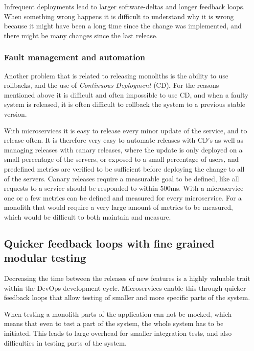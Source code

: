 \documentclass{article}
\begin{document}
Infrequent deployments lead to larger software-deltas and longer feedback loops. When something wrong happens it is difficult to understand why it is wrong because it might have been a long time since the change was implemented, and there might be many changes since the last release.

\subsubsection{Fault management and automation}
Another problem that is related to releasing monoliths is the ability to use rollbacks, and the use of \textit{Continuous Deployment} (CD). For the reasons mentioned above it is difficult and often impossible to use CD, and when a faulty system is released, it is often difficult to rollback the system to a previous stable version.

With microservices it is easy to release every minor update of the service, and to release often. It is therefore very easy to automate releases with CD's as well as managing releases with canary releases, where the update is only deployed on a small percentage of the servers, or exposed to a small percentage of users, and predefined metrics are verified to be sufficient before deploying the change to all of the servers. Canary releases require a measurable goal to be defined, like all requests to a service should be responded to within 500ms. With a microservice one or a few metrics can be defined and measured for every microservice. For a monolith that would require a very large amount of metrics to be measured, which would be difficult to both maintain and measure.


\subsection{Quicker feedback loops with fine grained modular testing}
Decreasing the time between the releases of new features is a highly valuable trait within the DevOps development cycle. Microservices enable this through quicker feedback loops that allow testing of smaller and more specific parts of the system.

When testing a monolith parts of the application can not be mocked, which means that even to test a part of the system, the whole system has to be initiated. This leads to large overhead for smaller integration tests, and also difficulties in testing parts of the system.
\end{document}

